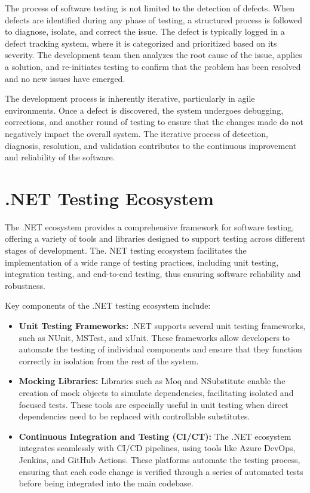 The process of software testing is not limited to the detection of defects. When defects are identified during any phase of testing, a structured process is followed to diagnose, isolate, and correct the issue. The defect is typically logged in a defect tracking system, where it is categorized and prioritized based on its severity. The development team then analyzes the root cause of the issue, applies a solution, and re-initiates testing to confirm that the problem has been resolved and no new issues have emerged.

The development process is inherently iterative, particularly in agile environments. Once a defect is discovered, the system undergoes debugging, corrections, and another round of testing to ensure that the changes made do not negatively impact the overall system. The iterative process of detection, diagnosis, resolution, and validation contributes to the continuous improvement and reliability of the software.

\section{.NET Testing Ecosystem}

The .NET ecosystem provides a comprehensive framework for software testing, offering a variety of tools and libraries designed to support testing across different stages of development. The. NET testing ecosystem facilitates the implementation of a wide range of testing practices, including unit testing, integration testing, and end-to-end testing, thus ensuring software reliability and robustness.

Key components of the .NET testing ecosystem include:

\begin{itemize}
    \item \textbf{Unit Testing Frameworks:} .NET supports several unit testing frameworks, such as NUnit, MSTest, and xUnit. These frameworks allow developers to automate the testing of individual components and ensure that they function correctly in isolation from the rest of the system.
    \item \textbf{Mocking Libraries:} Libraries such as Moq and NSubstitute enable the creation of mock objects to simulate dependencies, facilitating isolated and focused tests. These tools are especially useful in unit testing when direct dependencies need to be replaced with controllable substitutes.
    \item \textbf{Continuous Integration and Testing (CI/CT):} The .NET ecosystem integrates seamlessly with CI/CD pipelines, using tools like Azure DevOps, Jenkins, and GitHub Actions. These platforms automate the testing process, ensuring that each code change is verified through a series of automated tests before being integrated into the main codebase.
\end{itemize}

